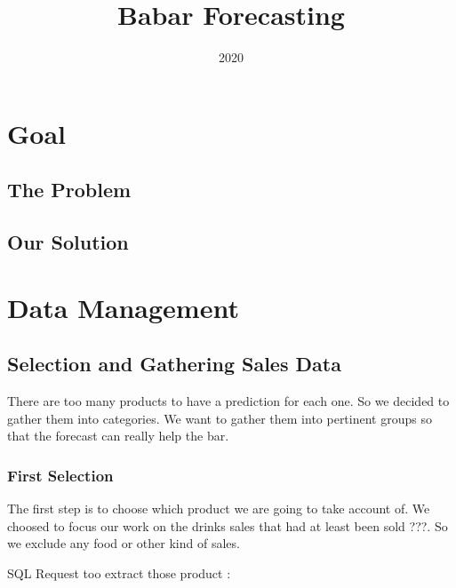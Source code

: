 \documentclass{report}
\title{Babar Forecasting}
\date{2020}
\begin{document}
 
\maketitle

\chapter{Goal}

\section{The Problem}

\section{Our Solution}

\chapter{Data Management}

\section{Selection and Gathering Sales Data}

There are too many products to have a prediction for each one. So we decided to gather them into categories. We want to gather them into pertinent groups so that the forecast can really help the bar. 

\subsection{First Selection}

The first step is to choose which product we are going to take account of. We choosed to focus our work on the drinks sales that had at least been sold ???. So we exclude any food or other kind of sales. 

SQL Request too extract those product : \\
 \\
\end{document}
